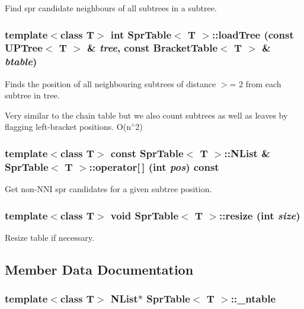 Find spr candidate neighbours of all subtrees in a subtree. 

\subsubsection{\setlength{\rightskip}{0pt plus 5cm}template$<$class T$>$ int {\bf Spr\-Table}$<$ T $>$::load\-Tree (const {\bf UPTree}$<$ T $>$ \& {\em tree}, const {\bf Bracket\-Table}$<$ T $>$ \& {\em btable})}\label{classSprTable_a4}


Finds the position of all neighbouring subtrees of distance $>$= 2 from each subtree in tree. 

Very similar to the chain table but we also count subtrees as well as leaves by flagging left-bracket positions. O(n$^\wedge$2) 
\subsubsection{\setlength{\rightskip}{0pt plus 5cm}template$<$class T$>$ const {\bf Spr\-Table}$<$ T $>$::{\bf NList} \& {\bf Spr\-Table}$<$ T $>$::operator[$\,$] (int {\em pos}) const\hspace{0.3cm}{\tt  [inline]}}\label{classSprTable_a7}


Get non-NNI spr candidates for a given subtree position. 

\subsubsection{\setlength{\rightskip}{0pt plus 5cm}template$<$class T$>$ void {\bf Spr\-Table}$<$ T $>$::resize (int {\em size})}\label{classSprTable_a3}


Resize table if necessary. 



\subsection{Member Data Documentation}
\subsubsection{\setlength{\rightskip}{0pt plus 5cm}template$<$class T$>$ {\bf NList}$\ast$ {\bf Spr\-Table}$<$ T $>$::{\bf \_\-ntable}\hspace{0.3cm}{\tt  [protected]}}\label{classSprTable_p0}


